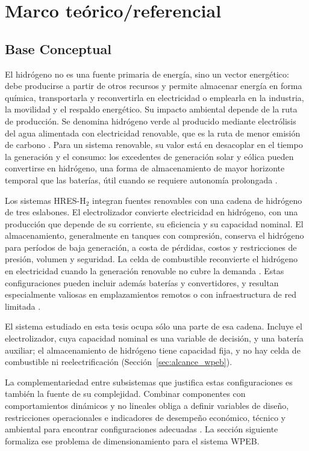 \chapter{Marco teórico/referencial}

\section{Base Conceptual}

El hidrógeno no es una fuente primaria de energía, sino un vector energético: debe producirse a partir de otros recursos y permite almacenar energía en forma química, transportarla y reconvertirla en electricidad o emplearla en la industria, la movilidad y el respaldo energético. Su impacto ambiental depende de la ruta de producción. Se denomina hidrógeno verde al producido mediante electrólisis del agua alimentada con electricidad renovable, que es la ruta de menor emisión de carbono \cite{Khan2022Review,Irena2020GreenHydrogen}. Para un sistema renovable, su valor está en desacoplar en el tiempo la generación y el consumo: los excedentes de generación solar y eólica pueden convertirse en hidrógeno, una forma de almacenamiento de mayor horizonte temporal que las baterías, útil cuando se requiere autonomía prolongada \cite{Khan2022Review,Zhang2018SA}.

Los sistemas HRES-H$_2$ integran fuentes renovables con una cadena de hidrógeno de tres eslabones. El electrolizador convierte electricidad en hidrógeno, con una producción que depende de su corriente, su eficiencia y su capacidad nominal. El almacenamiento, generalmente en tanques con compresión, conserva el hidrógeno para períodos de baja generación, a costa de pérdidas, costos y restricciones de presión, volumen y seguridad. La celda de combustible reconvierte el hidrógeno en electricidad cuando la generación renovable no cubre la demanda \cite{Khan2022Review,Wang2021HybridSystem}. Estas configuraciones pueden incluir además baterías y convertidores, y resultan especialmente valiosas en emplazamientos remotos o con infraestructura de red limitada \cite{Khan2022Review,Zhang2018SA}.

El sistema estudiado en esta tesis ocupa sólo una parte de esa cadena. Incluye el electrolizador, cuya capacidad nominal es una variable de decisión, y una batería auxiliar; el almacenamiento de hidrógeno tiene capacidad fija, y no hay celda de combustible ni reelectrificación (Sección~\ref{sec:alcance_wpeb}).

La complementariedad entre subsistemas que justifica estas configuraciones es también la fuente de su complejidad. Combinar componentes con comportamientos dinámicos y no lineales obliga a definir variables de diseño, restricciones operacionales e indicadores de desempeño económico, técnico y ambiental para encontrar configuraciones adecuadas \cite{Khan2022Review}. La sección siguiente formaliza ese problema de dimensionamiento para el sistema WPEB.

